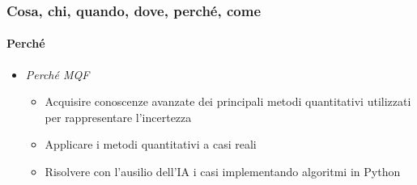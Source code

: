 \documentclass[trans]{beamer}%
\newenvironment{stepitemize}{\begin{itemize}[<+->]}{\end{itemize} }
\begin{document}
%

\begin{frame}%
%

\frametitle{Cosa, chi, quando, dove, perch\'{e}, come}%
%

\framesubtitle{Perch\'{e}}%
%

%


\begin{stepitemize}
\item \textit{Perch\'{e} MQF}

\begin{stepitemize}
\item Acquisire conoscenze avanzate dei principali metodi quantitativi
utilizzati per rappresentare l'incertezza

\item Applicare i metodi quantitativi a casi reali

\item Risolvere con l'ausilio dell'IA i casi implementando algoritmi in Python
\end{stepitemize}
\end{stepitemize}

%

\transboxout
\end{frame}%
%
\end{document}
